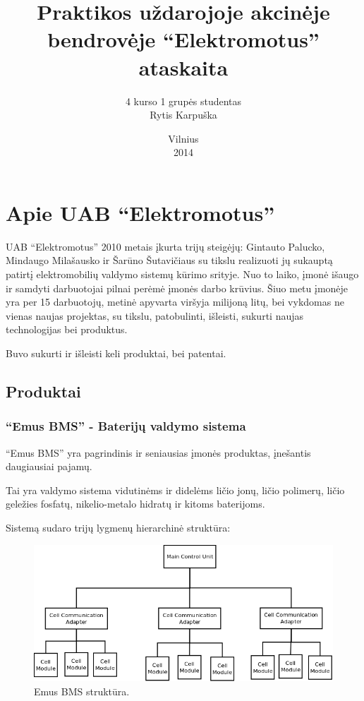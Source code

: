 \documentclass[12pt, a4paper, lithuanian, final]{article}
\title{Praktikos uždarojoje akcinėje bendrovėje "`Elektromotus"' ataskaita}
\author{
    4 kurso 1 grupės studentas \\
    Rytis Karpuška
}
\date{Vilnius \\
	2014}
\begin{document}
\maketitle





\section{Apie UAB "`Elektromotus"'}

UAB "`Elektromotus"' 2010 metais įkurta trijų steigėjų: Gintauto Palucko, Mindaugo Milašausko ir Šarūno Šutavičiaus su tikslu realizuoti jų sukauptą patirtį elektromobilių valdymo sistemų kūrimo srityje.
Nuo to laiko, įmonė išaugo ir samdyti darbuotojai pilnai perėmė įmonės darbo krūvius.
Šiuo metu įmonėje yra per 15 darbuotojų, metinė apyvarta viršyja milijoną litų, bei vykdomas ne vienas naujas projektas, su tikslu, patobulinti, išleisti, sukurti naujas technologijas bei produktus.

Buvo sukurti ir išleisti keli produktai, bei patentai.


\subsection{Produktai}
\subsubsection{"`Emus BMS"' - Baterijų valdymo sistema}
"`Emus BMS"' yra pagrindinis ir seniausias įmonės produktas, įnešantis daugiausiai pajamų.

Tai yra valdymo sistema vidutinėms ir didelėms ličio jonų, ličio polimerų, ličio geležies fosfatų, nikelio-metalo hidratų ir kitoms baterijoms.

Sistemą sudaro trijų lygmenų hierarchinė struktūra:

\begin{figure}[H]
\begin{center}
\includegraphics[width=1\textwidth]{img/bms_desc.png}
\caption{Emus BMS struktūra.}
\end{center}
\end{figure}
\end{document}
